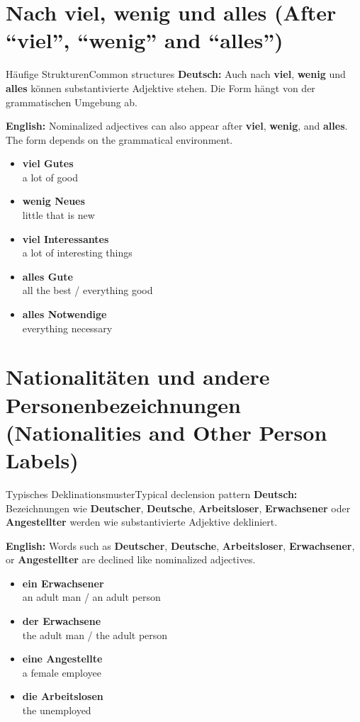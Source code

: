 \documentclass[a4paper,11pt]{article}
\newcommand{\GermanText}[1]{\textbf{Deutsch: }#1\par}
\newcommand{\EnglishText}[1]{{\small\color{SoftGray}\textbf{English: }#1\par}}
\newcommand{\ExampleItem}[2]{\item \textbf{#1}\\{\small\color{SoftGray}#2}}
\begin{document}
\section{Nach \glqq viel\grqq, \glqq wenig\grqq{} und \glqq alles\grqq{} \textnormal{(After ``viel'', ``wenig'' and ``alles'')}}
\begin{grammarentry}{Häufige Strukturen}{Common structures}
\GermanText{Auch nach \textbf{viel}, \textbf{wenig} und \textbf{alles} können substantivierte Adjektive stehen. Die Form hängt von der grammatischen Umgebung ab.}
\EnglishText{Nominalized adjectives can also appear after \textbf{viel}, \textbf{wenig}, and \textbf{alles}. The form depends on the grammatical environment.}
\end{grammarentry}
\begin{exbox}
\begin{itemize}
\ExampleItem{viel \textbf{Gutes}}{a lot of good}
\ExampleItem{wenig \textbf{Neues}}{little that is new}
\ExampleItem{viel \textbf{Interessantes}}{a lot of interesting things}
\ExampleItem{alles \textbf{Gute}}{all the best / everything good}
\ExampleItem{alles \textbf{Notwendige}}{everything necessary}
\end{itemize}
\end{exbox}

\section{Nationalitäten und andere Personenbezeichnungen \textnormal{(Nationalities and Other Person Labels)}}
\begin{grammarentry}{Typisches Deklinationsmuster}{Typical declension pattern}
\GermanText{Bezeichnungen wie \textbf{Deutscher}, \textbf{Deutsche}, \textbf{Arbeitsloser}, \textbf{Erwachsener} oder \textbf{Angestellter} werden wie substantivierte Adjektive dekliniert.}
\EnglishText{Words such as \textbf{Deutscher}, \textbf{Deutsche}, \textbf{Arbeitsloser}, \textbf{Erwachsener}, or \textbf{Angestellter} are declined like nominalized adjectives.}
\end{grammarentry}
\begin{exbox}
\begin{itemize}
\ExampleItem{ein \textbf{Erwachsener}}{an adult man / an adult person}
\ExampleItem{der \textbf{Erwachsene}}{the adult man / the adult person}
\ExampleItem{eine \textbf{Angestellte}}{a female employee}
\ExampleItem{die \textbf{Arbeitslosen}}{the unemployed}
\end{itemize}
\end{exbox}
\end{document}
